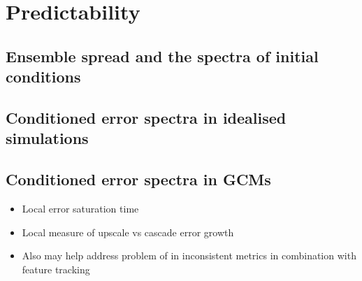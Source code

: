 \section{Predictability}

\subsection{Ensemble spread and the spectra of initial conditions}

\subsection{Conditioned error spectra in idealised simulations}

\subsection{Conditioned error spectra in GCMs}

\begin{itemize}

\item{Local error saturation time}

\item{Local measure of upscale vs cascade error growth}

\item{Also may help address problem of in inconsistent metrics in combination with feature tracking}

\end{itemize}





